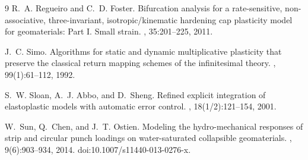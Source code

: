 \documentclass[12pt]{article}
\begin{document}
\begin{thebibliography}{9}
R.~A. Regueiro and C.~D. Foster.
\newblock Bifurcation analysis for a rate-sensitive, non-associative,
  three-invariant, isotropic/kinematic hardening cap plasticity model for
  geomaterials: Part I. Small strain.
, 35:201--225, 2011.

J.~C. Simo.
\newblock Algorithms for static and dynamic multiplicative plasticity that
  preserve the classical return mapping schemes of the infinitesimal theory.
,
  99(1):61--112, 1992.

S.~W. Sloan, A.~J. Abbo, and D.~Sheng.
\newblock Refined explicit integration of elastoplastic models with automatic
  error control.
, 18(1/2):121--154, 2001.

W.~Sun, Q.~Chen, and J.~T. Ostien.
\newblock Modeling the hydro-mechanical responses of strip and circular punch
  loadings on water-saturated collapsible geomaterials.
, 9(6):903--934, 2014.
\newblock doi:10.1007/s11440-013-0276-x.

\end{thebibliography}
\end{document}
